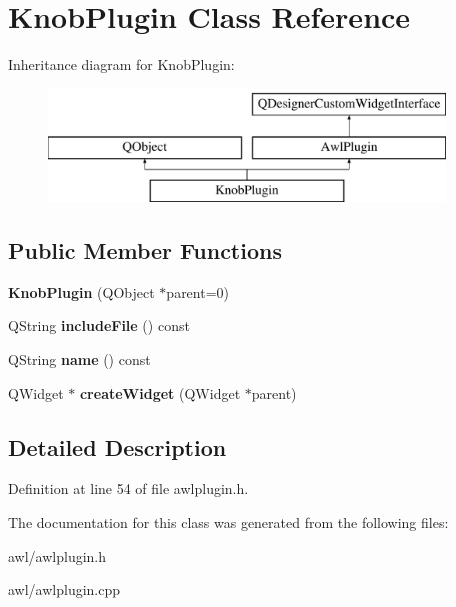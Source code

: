 \hypertarget{class_knob_plugin}{}\section{Knob\+Plugin Class Reference}
\label{class_knob_plugin}
Inheritance diagram for Knob\+Plugin\+:\begin{figure}[H]
\begin{center}
\leavevmode
\includegraphics[height=3.000000cm]{class_knob_plugin}
\end{center}
\end{figure}
\subsection*{Public Member Functions}
\begin{DoxyCompactItemize}
\item 
\mbox{\label{class_knob_plugin_a30a9a72b4a6e92f2ef6d417fea742a35}} 
{\bfseries Knob\+Plugin} (Q\+Object $\ast$parent=0)
\item 
\mbox{\label{class_knob_plugin_aa38e5daf0aa0b5b45c8693dcb69848eb}} 
Q\+String {\bfseries include\+File} () const
\item 
\mbox{\label{class_knob_plugin_ab33181b4816ae8736f58fa691da91f30}} 
Q\+String {\bfseries name} () const
\item 
\mbox{\label{class_knob_plugin_a24f386d13890fd738813af247a24804a}} 
Q\+Widget $\ast$ {\bfseries create\+Widget} (Q\+Widget $\ast$parent)
\end{DoxyCompactItemize}


\subsection{Detailed Description}


Definition at line 54 of file awlplugin.\+h.



The documentation for this class was generated from the following files\+:\begin{DoxyCompactItemize}
\item 
awl/awlplugin.\+h\item 
awl/awlplugin.\+cpp\end{DoxyCompactItemize}
